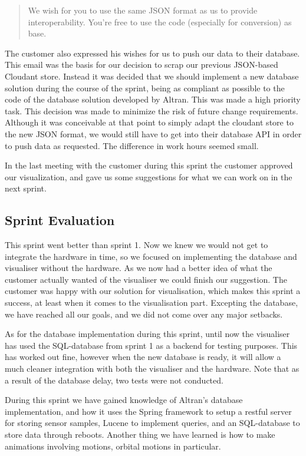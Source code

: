 \documentclass[../document]{subfiles}
\begin{document}
\begin{quote}
We wish for you to use the same JSON format as us to provide interoperability. You’re free to use the code (especially for conversion) as base.
\end{quote}

The customer also expressed his wishes for us to push our data to their database. This email was the basis for our decision to scrap our previous JSON-based Cloudant store. Instead it was decided that we should implement a new database solution during the course of the sprint, being as compliant as possible to the code of the database solution developed by Altran. This was made a high priority task. This decision was made to minimize the risk of future change requirements. Although it was conceivable at that point to simply adapt the cloudant store to the new JSON format, we would still have to get into their database API in order to push data as requested. The difference in work hours seemed small.

In the last meeting with the customer during this sprint the customer approved our visualization, and gave us some suggestions for what we can work on in the next sprint.  

\subsection{Sprint Evaluation}
This sprint went better than sprint 1. Now we knew we would not get to integrate the hardware in time, so we focused on implementing the database and visualiser without the hardware. As we now had a better idea of what the customer actually wanted of the visualiser we could finish our suggestion. The customer was happy with our solution for visualisation, which makes this sprint a success, at least when it comes to the visualisation part. Excepting the database, we have reached all our goals, and we did not come over any major setbacks.

As for the database implementation during this sprint, until now the visualiser has used the SQL-database from sprint 1 as a backend for testing purposes. This has worked out fine, however when the new database is ready, it will allow a much cleaner integration with both the visualiser and the hardware. Note that as a result of the database delay, two tests were not conducted.

During this sprint we have gained knowledge of Altran’s database implementation, and how it uses the Spring framework to setup a restful server for storing sensor samples, Lucene to implement queries, and an SQL-database to store data through reboots. Another thing we have learned is how to make animations involving motions, orbital motions in particular.
\end{document}
